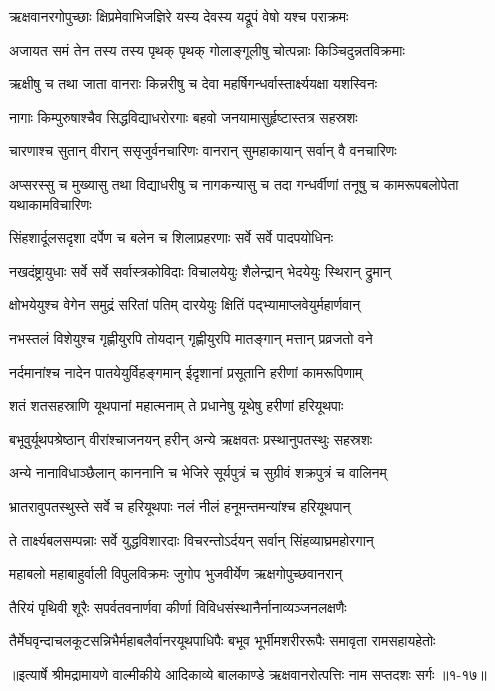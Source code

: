 \twolineshloka
{ऋक्षवानरगोपुच्छाः क्षिप्रमेवाभिजज्ञिरे}
{यस्य देवस्य यद्रूपं वेषो यश्च पराक्रमः} %

\twolineshloka
{अजायत समं तेन तस्य तस्य पृथक् पृथक्}
{गोलाङ्गूलीषु चोत्पन्नाः किञ्चिदुन्नतविक्रमाः} %

\twolineshloka
{ऋक्षीषु च तथा जाता वानराः किन्नरीषु च}
{देवा महर्षिगन्धर्वास्तार्क्ष्ययक्षा यशस्विनः} %

\twolineshloka
{नागाः किम्पुरुषाश्चैव सिद्धविद्याधरोरगाः}
{बहवो जनयामासुर्हृष्टास्तत्र सहस्रशः} %

\twolineshloka
{चारणाश्च सुतान् वीरान् ससृजुर्वनचारिणः}
{वानरान् सुमहाकायान् सर्वान् वै वनचारिणः} %

\threelineshloka
{अप्सरस्सु च मुख्यासु तथा विद्याधरीषु च}
{नागकन्यासु च तदा गन्धर्वीणां तनूषु च}
{कामरूपबलोपेता यथाकामविचारिणः} %

\twolineshloka
{सिंहशार्दूलसदृशा दर्पेण च बलेन च}
{शिलाप्रहरणाः सर्वे सर्वे पादपयोधिनः} %

\twolineshloka
{नखदंष्ट्रायुधाः सर्वे सर्वे सर्वास्त्रकोविदाः}
{विचालयेयुः शैलेन्द्रान् भेदयेयुः स्थिरान् द्रुमान्} %

\twolineshloka
{क्षोभयेयुश्च वेगेन समुद्रं सरितां पतिम्}
{दारयेयुः क्षितिं पद्भ्यामाप्लवेयुर्महार्णवान्} %

\twolineshloka
{नभस्तलं विशेयुश्च गृह्णीयुरपि तोयदान्}
{गृह्णीयुरपि मातङ्गान् मत्तान् प्रव्रजतो वने} %

\twolineshloka
{नर्दमानांश्च नादेन पातयेयुर्विहङ्गमान्}
{ईदृशानां प्रसूतानि हरीणां कामरूपिणाम्} %

\twolineshloka
{शतं शतसहस्राणि यूथपानां महात्मनाम्}
{ते प्रधानेषु यूथेषु हरीणां हरियूथपाः} %

\twolineshloka
{बभूवुर्यूथपश्रेष्ठान् वीरांश्चाजनयन् हरीन्}
{अन्ये ऋक्षवतः प्रस्थानुपतस्थुः सहस्रशः} %

\twolineshloka
{अन्ये नानाविधाञ्छैलान् काननानि च भेजिरे}
{सूर्यपुत्रं च सुग्रीवं शक्रपुत्रं च वालिनम्} %

\twolineshloka
{भ्रातरावुपतस्थुस्ते सर्वे च हरियूथपाः}
{नलं नीलं हनूमन्तमन्यांश्च हरियूथपान्} %

\twolineshloka
{ते तार्क्ष्यबलसम्पन्नाः सर्वे युद्धविशारदाः}
{विचरन्तोऽर्दयन् सर्वान् सिंहव्याघ्रमहोरगान्} %

\twolineshloka
{महाबलो महाबाहुर्वाली विपुलविक्रमः}
{जुगोप भुजवीर्येण ऋक्षगोपुच्छवानरान्} %

\twolineshloka
{तैरियं पृथिवी शूरैः सपर्वतवनार्णवा}
{कीर्णा विविधसंस्थानैर्नानाव्यञ्जनलक्षणैः} %

\twolineshloka
{तैर्मेघवृन्दाचलकूटसन्निभैर्महाबलैर्वानरयूथपाधिपैः}
{बभूव भूर्भीमशरीररूपैः समावृता रामसहायहेतोः} %


॥इत्यार्षे श्रीमद्रामायणे वाल्मीकीये आदिकाव्ये बालकाण्डे ऋक्षवानरोत्पत्तिः नाम सप्तदशः सर्गः ॥१-१७॥

